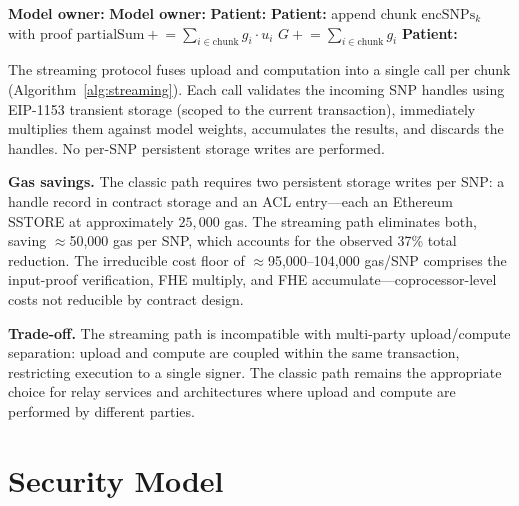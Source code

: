 \documentclass[10pt,twocolumn]{article}
\begin{document}
\begin{algorithm}[t]
\caption{Streaming PRS computation (patient, single-signer flow)}
\label{alg:streaming}
\small
\begin{algorithmic}[1]
\State \textbf{Model owner:} 
\State \textbf{Model owner:} 
\State \textbf{Patient:} 
  \State \textbf{Patient:} append chunk $\mathrm{encSNPs}_{k}$ with proof
  \State \quad $\mathrm{partialSum} \mathrel{+}= \sum_{i \in \mathrm{chunk}} g_i \cdot u_i$
  \State \quad $G \mathrel{+}= \sum_{i \in \mathrm{chunk}} g_i$
\EndFor
\State \textbf{Patient:} 
\end{algorithmic}
\end{algorithm}

The streaming protocol fuses upload and computation into a single call per chunk
(Algorithm~\ref{alg:streaming}).  Each call validates the incoming SNP handles
using EIP-1153 transient storage (scoped to the current transaction), immediately
multiplies them against model weights, accumulates the results, and discards the
handles.  No per-SNP persistent storage writes are performed.

\textbf{Gas savings.}
The classic path requires two persistent storage writes per SNP: a handle record in
contract storage and an ACL entry---each an Ethereum SSTORE at approximately
$25{,}000$ gas.  The streaming path eliminates both, saving $\approx$50,000 gas per
SNP, which accounts for the observed 37\% total reduction.  The irreducible cost
floor of $\approx$95,000--104,000 gas/SNP comprises the input-proof verification,
FHE multiply, and FHE accumulate---coprocessor-level costs not reducible by
contract design.

\textbf{Trade-off.}
The streaming path is incompatible with multi-party upload/compute separation:
upload and compute are coupled within the same transaction, restricting execution
to a single signer.  The classic path remains the appropriate choice for relay
services and architectures where upload and compute are performed by different
parties.

\section{Security Model}
\label{sec:security}
\end{document}
